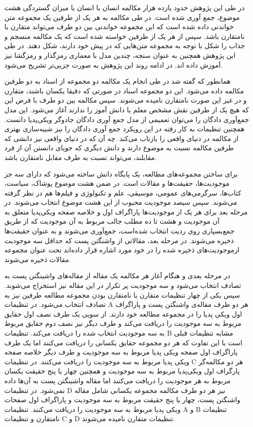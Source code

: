 در طی این پژوهش حدود یازده هزار مکالمه انسان با انسان با میزان گستردگی هشت موضوع، جمع آوری شده است. در طی مکالمه به هر یک از طرفین یک مجموعه متن خواندنی داده شده است که این مجموعه خواندنی بین دو طرف می‌تواند متقارن یا نامتقارن باشد. سپس از هر یک از طرفین خواسته ‌شده است که یک مکالمه منسجم و جذاب را شکل با توجه به مجموعه متن‌هایی که در پیش خود دارند، شکل دهند. 
در طی این پژوهش همچنین به عنوان سنجه،‌ چندین مدل با معماری رمزگذار و رمزگشا نیز آموزش داده اند. در ادامه روند این پژوهش به صورت جزیی‌تر تشریح می‌شود. 

همانطور که گفته شد در طی انجام یک مکالمه دو مجموعه از اسناد به دو طرفین مکالمه داده می‌شود. این دو مجموعه اسناد در صورتی که دقیقا یکسان باشند، متقارن و در غیر این صورت نامتقارن نامیده می‌شوند. سپس مکالمه بین دو طرف با فرض این که هیچ یک از طرفین نقش مشخص معلم یا دانش آموز را ندارند آغاز می‌شود. این مدل جمع‌آوری دادگان را می‌توان تعمیمی از مدل جمع آوری دادگان جادوگر ویکی‌پدیا دانست. همچنین تنظیمات به کار رفته در این رویکرد جمع آوری دادگان را نیز شبیه‌سازی بهتری از مکالمه در دنیای واقعی را بازتاب می‌کند. چه آن که در دنیای واقعی نیز دانشی که طرفین مکالمه نسبت به موضوع دارند و دانش دیگری که جویای دانستن آن از فرد مقابلند،‌ می‌تواند نسبت به طرف مقابل نامتقارن باشد. 

برای ساختن مجموعه‌های مطالعه، یک پایگاه دانش ساخته می‌شود که دارای سه جز موجودیت‌ها، حقیقت‌ها و مقالات است. در ضمن هشت موضوع پوشاک، سیاست، کتاب‌ها، سرگرمی‌های عمومی، موسیقی، علم و تکنولوژی و فیلم‌ها هم در نظر گرفته می‌شوند.
سپس سیصد موجودیت محبوب از این هشت موضوع انتخاب می‌شوند. 
در مرحله بعد برای هر یک از موجودیت‌ها پاراگراف اول و خلاصه صفحه ویکی‌پدیا 
متعلق به آن موجودیت و هشت تا ده مطلب جالب مربوط به آن موجودیت که از طریق جمع‌بسپاری روی ردیت انتخاب شده‌است، جمع‌آوری می‌شوند و به عنوان حقیقت‌ها ذخیره می‌شوند. 
در مرحله بعد، مقالاتی از واشنگتن پست که حداقل سه موجودیت ازموجودیت‌های ذخیره شده را در خود مورد اشاره قرار داده‌اند تحت عنوان مجموعه مقالات ذخیره می‌شوند.

در مرحله بعدی و هنگام آغاز هر مکالمه یک مقاله از مقاله‌های واشینگتن پست به تصادف انتخاب می‌شود  و سه موجودیت پر تکرار در این مقاله نیز استخراج می‌شوند. 
 سپس یکی از چهار تنظیمات متقارن یا نامتقارن بودن مجموعه مطالعه طرفین نیز به تصادف انتخاب می‌شود.
در تنظیمات A هر دو طرف مقاله‌ی واشنگتن پست و پاراگراف اول  ویکی پدیا را در مجموعه مطالعه خود دارند. از سویی یک طرف نصف اول حقایق مربوط به سه موجودیت را دریافت می‌کند و طرف دیگر نیز نصف دوم حقایق مربوط به سه موجودیت انتخاب شده را دریافت می‌کند.
تنظیمات B مشابه تنظیمات قبلی است با این تفاوت که هر دو مجموعه حقایق یکسانی را دریافت می‌کنند اما یک طرف پاراگراف اول  صفحه ویکی پدیا مربوط به سه موجودیت و طرف دیگر خلاصه صفحه ویکی پدیا مربوط به سه موجودیت را دریافت می‌کنند.
در تنظیمات C هر دو مکالمه‌گر پارگراف اول ویکی‌پدیا مربوط به سه موجودیت و همچنین چهار یا پنج حقیقت یکسان مربوط به هر موجودیت را دریافت می‌کنند اما مقاله واشینگتن پست به آن‌ها داده نمی‌شود. در تنظیمات D نیز هر دو طرف مکالمه مجموعه یکسانی شامل مقاله واشنگتن پست، چهار یا پنج حقیقت مربوط به سه موجودیت و پاراگراف اول صفحات ویکی پدیا مربوط به سه موجودیت را دریافت می‌کنند. تنظیمات A و B تنظیمات نامتقارن و تنظیمات C و D تنظیمات متقارن نامیده می‌شوند.

